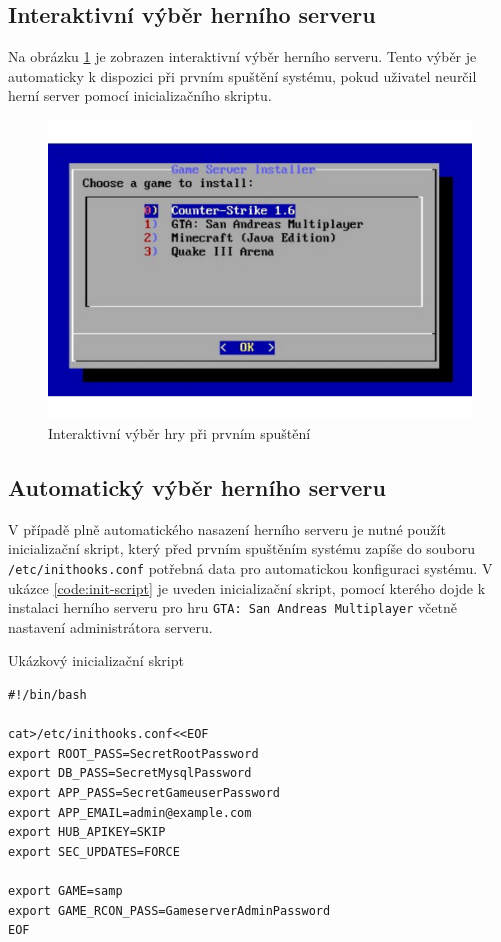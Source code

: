 \subsection{Interaktivní výběr herního serveru}

Na obrázku \ref{fig:game-selection} je zobrazen interaktivní výběr herního serveru. Tento výběr je automaticky
k dispozici při prvním spuštění systému, pokud uživatel neurčil herní server pomocí inicializačního skriptu.

\begin{figure}[h]
    \centering
    \includegraphics[width=1\linewidth]{chapters/images/game-selection.pdf}
    \caption{Interaktivní výběr hry při prvním spuštění}
    \label{fig:game-selection}
\end{figure}

\subsection{Automatický výběr herního serveru}

V případě plně automatického nasazení herního serveru je nutné použít inicializační skript, který před prvním spuštěním systému
zapíše do souboru \texttt{/etc/inithooks.conf} potřebná data pro automatickou konfiguraci systému.
V ukázce \ref{code:init-script} je uveden inicializační skript, pomocí kterého dojde k instalaci herního serveru pro hru \texttt{GTA: San Andreas Multiplayer}
včetně nastavení administrátora serveru.

\newpage

\begin{listing}[h!]
    \caption{Ukázkový inicializační skript}
    \label{code:init-script}
    \begin{verbatim}
#!/bin/bash

cat>/etc/inithooks.conf<<EOF
export ROOT_PASS=SecretRootPassword
export DB_PASS=SecretMysqlPassword
export APP_PASS=SecretGameuserPassword
export APP_EMAIL=admin@example.com
export HUB_APIKEY=SKIP
export SEC_UPDATES=FORCE

export GAME=samp
export GAME_RCON_PASS=GameserverAdminPassword
EOF
    \end{verbatim}
\end{listing}

